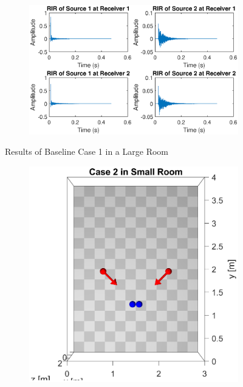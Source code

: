 \documentclass[a4paper,twoside,12pt,hidelinks]{article}
\begin{document}
\begin{appendices}
\begin{figure}[H]
\begin{subfigure}[H]{0.55\textwidth}
\includegraphics[width=\textwidth]{1l_ir}
\end{subfigure}
\caption{Results of Baseline Case 1 in a Large Room}
\end{figure}
\newpage
\begin{figure}[H]
\centering
\begin{subfigure}[H]{0.35\textwidth}
\includegraphics[width=\textwidth]{2s_lo}
\end{subfigure}
\begin{subfigure}[H]{0.6\textwidth}

\end{subfigure}
\end{figure}
\end{appendices}
\end{document}
